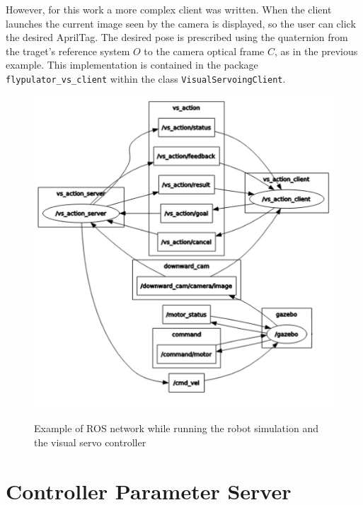 However, for this work a more complex client was written. When the client launches the current image seen by the camera is displayed, so the user can click the desired AprilTag. The desired pose is prescribed using the quaternion from the traget's reference system $O$ to the camera optical frame $C$, as in the previous example. This implementation is contained in the package \texttt{flypulator\_vs\_client} within the class \texttt{VisualServoingClient}.


\begin{figure}[!htb]
	\caption{Example of ROS network while running the robot simulation and the visual servo controller}
	\centering
	\includegraphics[width=\textwidth]{content/chapter_05/images/action_interface_rqt.png}
	\label{fig:action_interface_ros}
\end{figure}

\section{Controller Parameter Server}
\label{sec:parameter_server}

